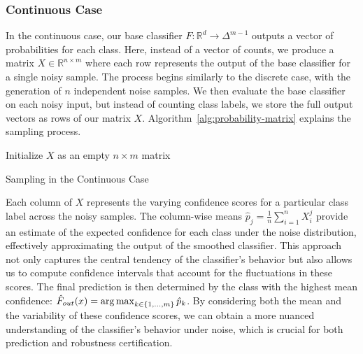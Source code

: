 \subsubsection{Continuous Case}\label{subsubsec:continuous-case-monte-carlo-simulation}
In the continuous case, our base classifier $F: \mathbb{R}^d \rightarrow \Delta^{m-1}$ outputs a vector of probabilities for each class.
Here, instead of a vector of counts, we produce a matrix $X \in \mathbb{R}^{n \times m}$ where each row represents the output of the base classifier for a single noisy sample.
The process begins similarly to the discrete case, with the generation of $n$ independent noise samples.
We then evaluate the base classifier on each noisy input, but instead of counting class labels, we store the full output vectors as rows of our matrix $X$.
Algorithm~\ref{alg:probability-matrix} explains the sampling process.
\begin{algorithm}[htbp]
    \DontPrintSemicolon
    Initialize $X$ as an empty $n \times m$ matrix\;
    \caption{Sampling in the Continuous Case}\label{alg:probability-matrix}
\end{algorithm}

Each column of $X$ represents the varying confidence scores for a particular class label across the noisy samples.
The column-wise means $\hat{p}_j = \frac{1}{n} \sum_{i=1}^n X_i^j$ provide an estimate of the expected confidence for each class under the noise distribution, effectively approximating the output of the smoothed classifier.
This approach not only captures the central tendency of the classifier's behavior but also allows us to compute confidence intervals that account for the fluctuations in these scores.
The final prediction is then determined by the class with the highest mean confidence: $\hat{F}_{out}(x) = \operatorname*{arg\,max}_{k \in \{1, \ldots, m\}} \hat{p}_k$.
By considering both the mean and the variability of these confidence scores, we can obtain a more nuanced understanding of the classifier's behavior under noise, which is crucial for both prediction and robustness certification.

